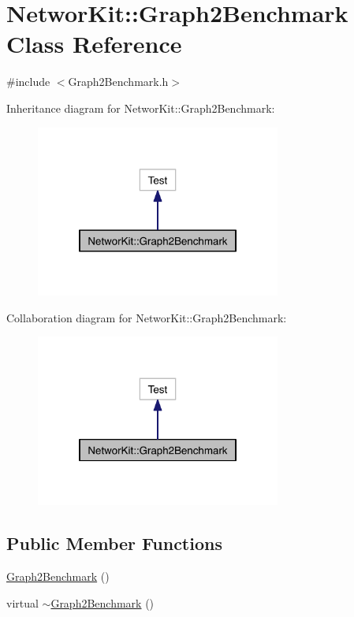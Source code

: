 \hypertarget{class_networ_kit_1_1_graph2_benchmark}{\section{Networ\-Kit\-:\-:Graph2\-Benchmark Class Reference}
\label{class_networ_kit_1_1_graph2_benchmark}
}


{\ttfamily \#include $<$Graph2\-Benchmark.\-h$>$}



Inheritance diagram for Networ\-Kit\-:\-:Graph2\-Benchmark\-:\nopagebreak
\begin{figure}[H]
\begin{center}
\leavevmode
\includegraphics[width=228pt]{class_networ_kit_1_1_graph2_benchmark__inherit__graph}
\end{center}
\end{figure}


Collaboration diagram for Networ\-Kit\-:\-:Graph2\-Benchmark\-:\nopagebreak
\begin{figure}[H]
\begin{center}
\leavevmode
\includegraphics[width=228pt]{class_networ_kit_1_1_graph2_benchmark__coll__graph}
\end{center}
\end{figure}
\subsection*{Public Member Functions}
\begin{DoxyCompactItemize}
\item 
\hyperlink{class_networ_kit_1_1_graph2_benchmark_a31d5521dff12225788c9b3b44f7c9bfc}{Graph2\-Benchmark} ()
\item 
virtual \hyperlink{class_networ_kit_1_1_graph2_benchmark_a86724c1fda1f17b66e2d43d22cb9704b}{$\sim$\-Graph2\-Benchmark} ()
\end{DoxyCompactItemize}


